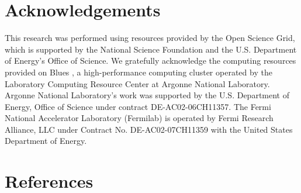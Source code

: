 \documentclass[final,1p,11pt]{elsarticle}
\begin{document}








\section*{Acknowledgements}
This research was performed using resources provided by the Open Science Grid,
which is supported by the National Science Foundation and the U.S. Department of Energy's Office of Science. 
We gratefully acknowledge the computing resources provided on Blues
, 
a high-performance computing cluster operated by the Laboratory Computing Resource Center at Argonne National Laboratory.
Argonne National Laboratory's work was supported by the U.S. Department of Energy, Office of Science under contract DE-AC02-06CH11357.
The Fermi National Accelerator Laboratory (Fermilab) is operated by Fermi Research Alliance, LLC under Contract No. DE-AC02-07CH11359 with the United States Department of Energy.

\newpage
\section*{References}


\def\bibname{\Large\bf References}
\def\refname{\Large\bf References}
\pagestyle{plain}

\end{document}
